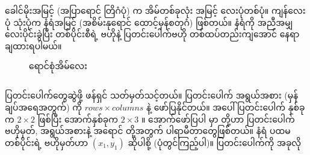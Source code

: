 ခေါင်မိုးအမြင့် (အပြာရောင် တြိဂံပုံ) က အိမ်တစ်ခုလုံး အမြင့် လေးပုံတစ်ပုံ။ ကျန်လေးပုံ သုံးပုံက နံရံအမြင့် (အစိမ်းနုရောင် ထောင့်မှန်စတုဂံ) ဖြစ်တယ်။ နံရံကို အညီအမျှ လေးပိုင်းခွဲပြီး တစ်ပိုင်းစီရဲ့ ဗဟိုနဲ့ ပြတင်းပေါက်ဗဟို တစ်ထပ်တည်းကျအောင် နေရာချထားရပါမယ်။ 

\begin{figure}[b!]
\caption{ရောင်စုံအိမ်လေး} 
\label{fig:colorful_house}
\end{figure}

\subsection*{}
ပြတင်းပေါက်တွေဆွဲဖို့  ဖန်ရှင် သတ်မှတ်သင့်တယ်။ ပြတင်းပေါက် အရွယ်အစား (မှန်ချပ်အရေအတွက်) ကို $rows \times columns$ နဲ့ ဖော်ပြနိုင်တယ်။  အပေါ်ပြတင်းပေါက် နှစ်ခုက $2 \times 2$ ဖြစ်ပြီး အောက်နှစ်ခုက $2 \times 3$ ။  အောက်ဖော်ပြပါ  မှာ \fEn{,} \fEn{,} \fEn{,}  တို့ဟာ ပြတင်းပေါက် ဗဟိုမှတ်, အရွယ်အစားနဲ့ အရောင် တို့အတွက် ပါရာမီတာတွေဖြစ်တယ်။ နံရံ ပထမတစ်ပိုင်းရဲ့ ဗဟိုမှတ်ဟာ $(x_1, y_1)$ ဆိုပါစို့ (ပုံတွင်ကြည့်ပါ)။ ပြတင်းပေါက်ကို အခုလို

